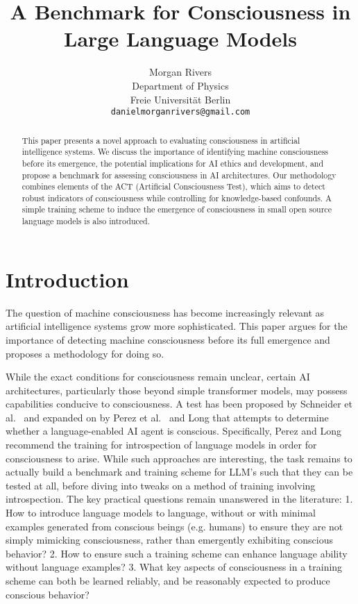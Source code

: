 \documentclass{article}
\title{A Benchmark for Consciousness in Large Language Models}
\author{Morgan Rivers \\
        Department of Physics \\
        Freie Universität Berlin \\    
        \texttt{danielmorganrivers@gmail.com}
}
\begin{document}
\maketitle

\begin{abstract}
This paper presents a novel approach to evaluating consciousness in artificial intelligence systems. We discuss the importance of identifying machine consciousness before its emergence, the potential implications for AI ethics and development, and propose a benchmark for assessing consciousness in AI architectures. Our methodology combines elements of the ACT (Artificial Consciousness Test), which aims to detect robust indicators of consciousness while controlling for knowledge-based confounds. A simple training scheme to induce the emergence of consciousness in small open source language models is also introduced.
\end{abstract}

\section{Introduction}
The question of machine consciousness has become increasingly relevant as artificial intelligence systems grow more sophisticated. This paper argues for the importance of detecting machine consciousness before its full emergence and proposes a methodology for doing so.

While the exact conditions for consciousness remain unclear, certain AI architectures, particularly those beyond simple transformer models, may possess capabilities conducive to consciousness. A test has been proposed by Schneider et al.\ \citep{turner2018testing} and expanded on by Perez et al.\ \citep{perez2023evaluatingaisystemsmoral} and Long \citep{long2023introspective} that attempts to determine whether a language-enabled AI agent is conscious. Specifically, Perez and Long recommend the training for introspection of language models in order for consciousness to arise. While such approaches are interesting, the task remains to actually build a benchmark and training scheme for LLM's such that they can be tested at all, before diving into tweaks on a method of training involving introspection. The key practical questions remain unanswered in the literature:
1. How to introduce language models to language, without or with minimal examples generated from conscious beings (e.g. humans) to ensure they are not simply mimicking consciousness, rather than emergently exhibiting conscious behavior?
2. How to ensure such a training scheme can enhance language ability without language examples?
3. What key aspects of consciousness in a training scheme can both be learned reliably, and be reasonably expected to produce conscious behavior?
\end{document}
